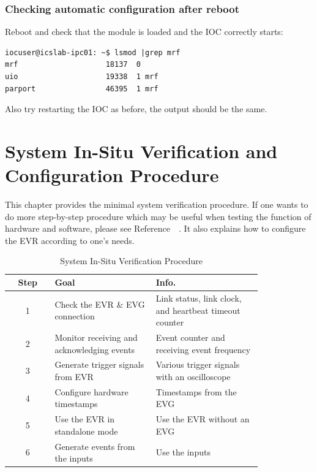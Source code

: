 \documentclass[11pt
  , a4paper
  , article
  , oneside
  , showtrims
]{memoir}
\begin{document}
{\subsection{Checking automatic configuration after reboot}
Reboot and check that the module is loaded and the IOC correctly starts:
\begin{lstlisting}[style=termstyle]
iocuser@icslab-ipc01: ~$ lsmod |grep mrf
mrf                    18137  0
uio                    19338  1 mrf
parport                46395  1 mrf
\end{lstlisting}
Also try restarting the IOC as before, the output should be the same.



\newpage
\chapter{System In-Situ Verification and Configuration Procedure}
This chapter provides the minimal system verification procedure. If one wants to do more step-by-step procedure which may be useful when testing the function of hardware and software, please see Reference~~\citep[see][p14]{EVR-USER-GUIDE}. It also explains how to configure the EVR according to one's needs.

\begin{table}[!htb]
  \centering
  \begin{tabular}{c|p{0.4\linewidth}|p{0.42\linewidth}}
    \toprule
    Step & Goal                                       & Info.                                                  \\\midrule
    1    & Check the EVR \& EVG connection            & Link status, link clock, and heartbeat timeout counter \\\midrule
    2    & Monitor receiving and acknowledging events & Event counter and receiving event frequency            \\\midrule
    3    & Generate trigger signals from EVR          & Various trigger signals with an oscilloscope           \\\midrule
    4    & Configure hardware timestamps              & Timestamps from the EVG                                \\\midrule
    5    & Use the EVR in standalone mode             & Use the EVR without an EVG                             \\\midrule
    6    & Generate events from the inputs            & Use the inputs                                         \\\bottomrule
  \end{tabular}
  \caption[]{System In-Situ Verification Procedure}
  \label{table:checklist}
\end{table}


}
\end{document}
